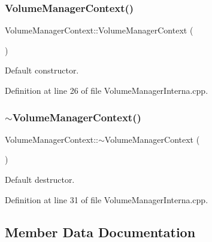 \subsubsection{\texorpdfstring{Volume\+Manager\+Context()}{VolumeManagerContext()}}
{\footnotesize\ttfamily Volume\+Manager\+Context\+::\+Volume\+Manager\+Context (\begin{DoxyParamCaption}{ }\end{DoxyParamCaption})}



Default constructor. 



Definition at line 26 of file Volume\+Manager\+Interna.\+cpp.

\hypertarget{class_d_d4hep_1_1_geometry_1_1_volume_manager_context_aa150cfab1e19826e9e6fddd194b2390a}{}\label{class_d_d4hep_1_1_geometry_1_1_volume_manager_context_aa150cfab1e19826e9e6fddd194b2390a} 
\subsubsection{\texorpdfstring{$\sim$\+Volume\+Manager\+Context()}{~VolumeManagerContext()}}
{\footnotesize\ttfamily Volume\+Manager\+Context\+::$\sim$\+Volume\+Manager\+Context (\begin{DoxyParamCaption}{ }\end{DoxyParamCaption})\hspace{0.3cm}{\ttfamily [virtual]}}



Default destructor. 



Definition at line 31 of file Volume\+Manager\+Interna.\+cpp.



\subsection{Member Data Documentation}
\hypertarget{class_d_d4hep_1_1_geometry_1_1_volume_manager_context_a4b637a36900149ff3490731f62ca1d52}{}\label{class_d_d4hep_1_1_geometry_1_1_volume_manager_context_a4b637a36900149ff3490731f62ca1d52} 
